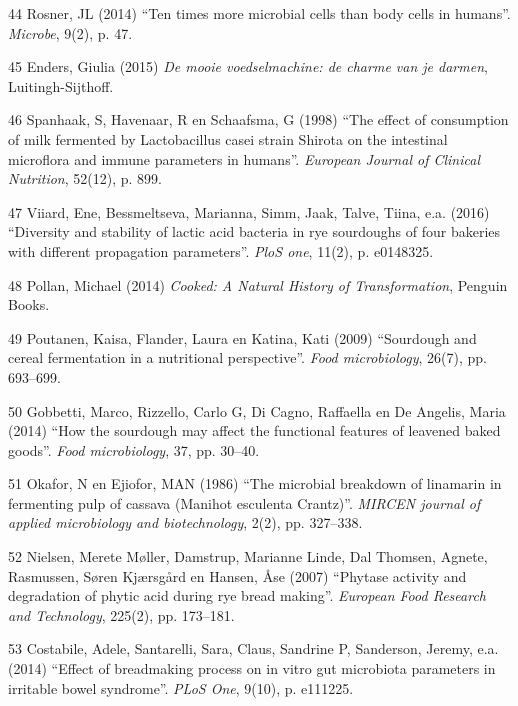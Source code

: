 \documentclass[
  11pt,
  dutch,
]{memoir}
\newlength{\cslhangindent}
\newenvironment{cslreferences}%
  {\setlength{\parindent}{0pt}%
  \everypar{\setlength{\hangindent}{\cslhangindent}}\ignorespaces}%
  {\par}
\begin{document}
\begin{cslreferences}
\leavevmode\hypertarget{ref-rosner2014ten}{}%
44 Rosner, JL (2014) ``Ten times more microbial cells than body cells in
humans''. \emph{Microbe}, 9(2), p. 47.

\leavevmode\hypertarget{ref-voedselmachine}{}%
45 Enders, Giulia (2015) \emph{De mooie voedselmachine: de charme van je
darmen}, Luitingh-Sijthoff.

\leavevmode\hypertarget{ref-spanhaak1998effect}{}%
46 Spanhaak, S, Havenaar, R en Schaafsma, G (1998) ``The effect of
consumption of milk fermented by Lactobacillus casei strain Shirota on
the intestinal microflora and immune parameters in humans''.
\emph{European Journal of Clinical Nutrition}, 52(12), p. 899.

\leavevmode\hypertarget{ref-viiard2016diversity}{}%
47 Viiard, Ene, Bessmeltseva, Marianna, Simm, Jaak, Talve, Tiina, e.a.
(2016) ``Diversity and stability of lactic acid bacteria in rye
sourdoughs of four bakeries with different propagation parameters''.
\emph{PloS one}, 11(2), p. e0148325.

\leavevmode\hypertarget{ref-pollancooked}{}%
48 Pollan, Michael (2014) \emph{Cooked: A Natural History of
Transformation}, Penguin Books.

\leavevmode\hypertarget{ref-poutanen2009sourdough}{}%
49 Poutanen, Kaisa, Flander, Laura en Katina, Kati (2009) ``Sourdough
and cereal fermentation in a nutritional perspective''. \emph{Food
microbiology}, 26(7), pp. 693--699.

\leavevmode\hypertarget{ref-gobbetti2014sourdough}{}%
50 Gobbetti, Marco, Rizzello, Carlo G, Di Cagno, Raffaella en De
Angelis, Maria (2014) ``How the sourdough may affect the functional
features of leavened baked goods''. \emph{Food microbiology}, 37, pp.
30--40.

\leavevmode\hypertarget{ref-okafor1986microbial}{}%
51 Okafor, N en Ejiofor, MAN (1986) ``The microbial breakdown of
linamarin in fermenting pulp of cassava (Manihot esculenta Crantz)''.
\emph{MIRCEN journal of applied microbiology and biotechnology}, 2(2),
pp. 327--338.

\leavevmode\hypertarget{ref-nielsen2007phytase}{}%
52 Nielsen, Merete Møller, Damstrup, Marianne Linde, Dal Thomsen,
Agnete, Rasmussen, Søren Kjærsgård en Hansen, Åse (2007) ``Phytase
activity and degradation of phytic acid during rye bread making''.
\emph{European Food Research and Technology}, 225(2), pp. 173--181.

\leavevmode\hypertarget{ref-costabile2014effect}{}%
53 Costabile, Adele, Santarelli, Sara, Claus, Sandrine P, Sanderson,
Jeremy, e.a. (2014) ``Effect of breadmaking process on in vitro gut
microbiota parameters in irritable bowel syndrome''. \emph{PLoS One},
9(10), p. e111225.


\end{cslreferences}
\end{document}
